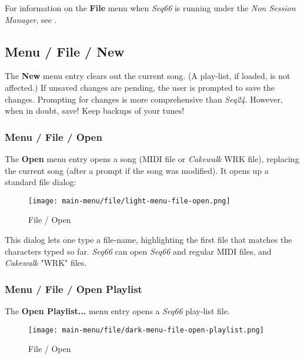    For information on the \textbf{File} menu when \textsl{Seq66} is
   running under the \textsl{Non Session Manager}, see
   .

\subsection{Menu / File / New}
\label{subsec:menu_file_new}

   The \textbf{New} menu entry clears out the current song.
   (A play-list, if loaded, is not affected.)
   If unsaved changes are pending, the user is prompted to save the changes.
   Prompting for changes is more comprehensive than \textsl{Seq24}.
   However, when in doubt, save!  Keep backups of your tunes!

\subsubsection{Menu / File / Open}
\label{subsubsec:seq66_menu_file_open}

   The \textbf{Open} menu entry opens a song (MIDI file or \textsl{Cakewalk}
   WRK file), replacing the current song (after a prompt if the song was
   modified).
   It opens up a standard file dialog:

\begin{figure}[H]
   \centering 
   \texttt{[image: main-menu/file/light-menu-file-open.png]}
   \caption{File / Open}
   \label{fig:seq66_menu_file_open}
\end{figure}

   This dialog lets one type a file-name, highlighting the first file
   that matches the characters typed so far.
   \textsl{Seq66} can open \textsl{Seq66} and regular MIDI files, and
   \textsl{Cakewalk} "WRK" files.

\subsubsection{Menu / File / Open Playlist}
\label{subsubsec:seq66_menu_file_open_playlist}

   The \textbf{Open Playlist...} menu entry opens a \textsl{Seq66}
   play-list file.

\begin{figure}[H]
   \centering 
   \texttt{[image: main-menu/file/dark-menu-file-open-playlist.png]}
   \caption{File / Open}
   \label{fig:seq66_menu_file_open_playlist}
\end{figure}

